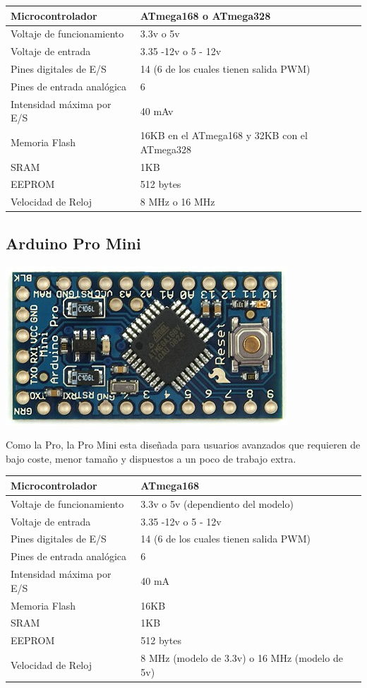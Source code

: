 \documentclass[12pt,a4paper]{report}
\begin{document}
\begin{tabular}{||l | l ||}
\hline
\hline
Microcontrolador & ATmega168 o ATmega328\\
\hline
Voltaje de funcionamiento & 3.3v o 5v\\
\hline
Voltaje de entrada & 3.35 -12v o 5 - 12v\\
\hline
Pines digitales de E/S & 14 (6 de los cuales tienen salida PWM)\\
\hline
Pines de entrada analógica & 6\\
\hline
Intensidad máxima por E/S & 40 mAv\\
\hline
Memoria Flash & 16KB en el ATmega168 y 32KB con el ATmega328 \\
\hline
SRAM & 1KB\\
\hline
EEPROM & 512 bytes\\
\hline
Velocidad de Reloj & 8 MHz o 16 MHz\\
\hline
\hline
\end{tabular}

\subsection{Arduino Pro Mini}

\includegraphics[scale=0.6]{ArduinoProMini.jpg}

Como la Pro, la Pro Mini esta diseñada para usuarios avanzados que requieren de bajo coste, menor tamaño y dispuestos a un poco de trabajo extra. 

\begin{tabular}{||l | l ||}
\hline
\hline
Microcontrolador & ATmega168\\
\hline
Voltaje de funcionamiento & 3.3v o 5v (dependiento del modelo)\\
\hline
Voltaje de entrada & 3.35 -12v o 5 - 12v\\
\hline
Pines digitales de E/S & 14 (6 de los cuales tienen salida PWM)\\
\hline
Pines de entrada analógica & 6\\
\hline
Intensidad máxima por E/S & 40 mA\\
\hline
Memoria Flash & 16KB\\
\hline
SRAM & 1KB\\
\hline
EEPROM & 512 bytes\\
\hline
Velocidad de Reloj & 8 MHz (modelo de 3.3v) o 16 MHz (modelo de 5v)\\
\hline
\hline
\end{tabular}
\end{document}

